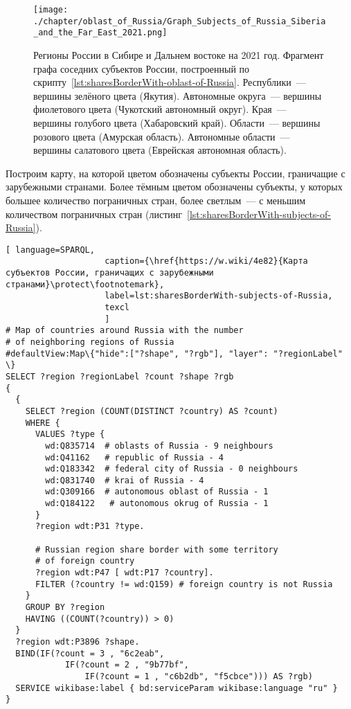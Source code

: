 \begin{fullwidth}
\begin{figure*}[h]
	\texttt{[image: ./chapter/oblast\_of\_Russia/Graph\_Subjects\_of\_Russia\_Siberia\_and\_the\_Far\_East\_2021.png]}
	\caption[Граф субъектов России. Калининград, 2021.]{Регионы России в Сибире и Дальнем востоке на 2021 год. 
    Фрагмент графа соседних субъектов России, построенный по скрипту~\protect\ref{lst:sharesBorderWith-oblast-of-Russia}.
	Республики~--- вершины зелёного цвета (Якутия).
	Автономные округа~--- вершины фиолетового цвета (Чукотский автономный округ).
	Края~--- вершины голубого цвета (Хабаровский край).
	Области~--- вершины розового цвета (Амурская область).
	Автономные области~--- вершины салатового цвета (Еврейская автономная область).}%
      \label{fig:sharesBorderWith-oblast-of-Russia-Kaliningrad-fig}%
\end{figure*} 
\end{fullwidth}

\newpage
Построим карту, на которой цветом обозначены субъекты России, 
граничащие с зарубежными странами. 
Более тёмным цветом обозначены субъекты, у которых большее количество пограничных стран, 
более светлым~--- с меньшим количеством пограничных стран (листинг~\ref{lst:sharesBorderWith-subjects-of-Russia}).

\lstset{numbers=left, firstnumber=1, frame=single}
\begin{lstlisting}[ language=SPARQL, 
                    caption={\href{https://w.wiki/4e82}{Карта субъектов России, граничащих с зарубежными странами}\protect\footnotemark},
                    label=lst:sharesBorderWith-subjects-of-Russia,
                    texcl 
                    ]
# Map of countries around Russia with the number 
# of neighboring regions of Russia
#defaultView:Map\{"hide":["?shape", "?rgb"], "layer": "?regionLabel" \}
SELECT ?region ?regionLabel ?count ?shape ?rgb
{
  {
    SELECT ?region (COUNT(DISTINCT ?country) AS ?count)
    WHERE {
      VALUES ?type {
        wd:Q835714  # oblasts of Russia - 9 neighbours
        wd:Q41162   # republic of Russia - 4
        wd:Q183342  # federal city of Russia - 0 neighbours
        wd:Q831740  # krai of Russia - 4
        wd:Q309166  # autonomous oblast of Russia - 1
        wd:Q184122   # autonomous okrug of Russia - 1
      }
      ?region wdt:P31 ?type.
  
      # Russian region share border with some territory 
      # of foreign country
      ?region wdt:P47 [ wdt:P17 ?country].
      FILTER (?country != wd:Q159) # foreign country is not Russia
    }
    GROUP BY ?region
    HAVING ((COUNT(?country)) > 0)
  }
  ?region wdt:P3896 ?shape.
  BIND(IF(?count = 3 , "6c2eab", 
            IF(?count = 2 , "9b77bf", 
                IF(?count = 1 , "c6b2db", "f5cbce"))) AS ?rgb)
  SERVICE wikibase:label { bd:serviceParam wikibase:language "ru" }  
}
\end{lstlisting}%

